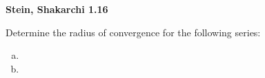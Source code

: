 \textbf{Stein, Shakarchi 1.16}

Determine the radius of convergence for the following series:

\begin{enumerate}[(a)]
    \item 
    \item 
\end{enumerate}